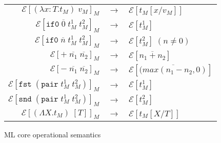 \begin{figure}
\onehalfspacing
\begin{center}
\begin{tabular}{rcl}
$\mathscr{E}[(\lambda x:T.t_{M})\;v_{M}]_{M}$ & $\rightarrow$ & $\mathscr{E}[t_{M}[x/v_{M}]]$ \\
$\mathscr{E}[\mathtt{if0}\;\overline{0}\;t_{M}^{1}\;t_{M}^{2}]_{M}$ & $\rightarrow$ & $\mathscr{E}[t_{M}^{1}]$ \\
$\mathscr{E}[\mathtt{if0}\;\overline{n}\;t_{M}^{1}\;t_{M}^{2}]_{M}$ & $\rightarrow$ & $\mathscr{E}[t_{M}^{2}]\;(n\neq0)$ \\
$\mathscr{E}[+\;\overline{n_{1}}\;\overline{n_{2}}]_{M}$ & $\rightarrow$ & $\mathscr{E}[\overline{n_{1}+n_{2}}]$ \\
$\mathscr{E}[-\;\overline{n_{1}}\;\overline{n_{2}}]_{M}$ & $\rightarrow$ & $\mathscr{E}[\overline{(max(n_{1}-n_{2},0)}]$ \\
$\mathscr{E}[\mathtt{fst}\;(\mathtt{pair}\;t_{M}^{1}\;t_{M}^{2})]_{M}$ & $\rightarrow$ & $\mathscr{E}[t_{M}^{1}]$ \\
$\mathscr{E}[\mathtt{snd}\;(\mathtt{pair}\;t_{M}^{1}\;t_{M}^{2})]_{M}$ & $\rightarrow$ & $\mathscr{E}[t_{M}^{2}]$ \\
$\mathscr{E}[(\Lambda X.t_{M})\;[T]]_{M}$ & $\rightarrow$ & $\mathscr{E}[t_{M}[X/T]]$
\end{tabular}
\end{center}
\caption{ML core operational semantics}
\label{fig:mcos}
\end{figure}